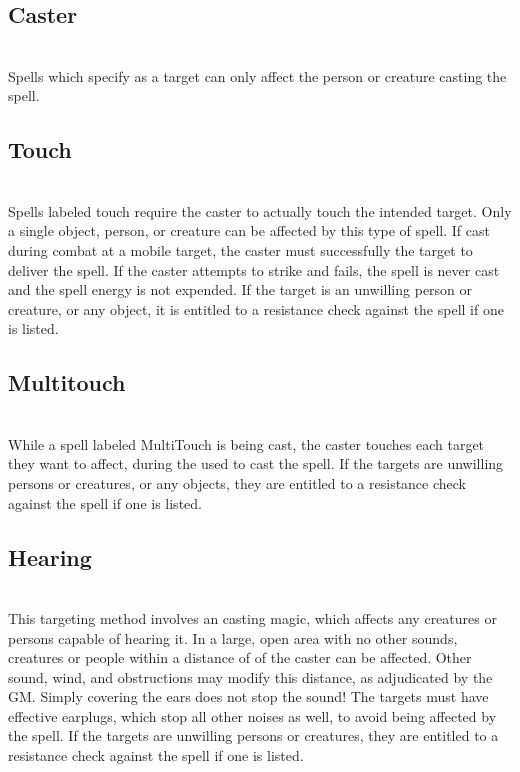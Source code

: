 \begin{multicols*}{2}
\subsection{Caster}
\\
Spells which specify  as a target can only
affect the person or creature casting the spell.
\subsection{Touch}
\\
Spells labeled touch require the caster to actually touch the intended target. Only a single object, person, or creature can be affected by this type of spell. If cast during combat at a mobile target, the caster must successfully  the target to deliver the spell. If the caster attempts to strike and fails, the spell is never cast and the spell energy is not expended. If the target is an unwilling person or creature,
or any object, it is entitled to a resistance check against the spell if one is listed.
\subsection{Multitouch}
\\
While a spell labeled MultiTouch is being cast, the caster touches each target they want to affect, during the  used to cast the spell.  If the targets are unwilling persons or creatures, or any objects, they are entitled to a resistance check against the spell if one is listed.
\subsection{Hearing}
\\
This targeting method involves an  casting magic, which affects any creatures or persons capable of hearing it. In a large, open area with no other sounds,  creatures or people within a distance of  of the caster can be affected. Other sound, wind, and obstructions may modify this distance, as adjudicated by the GM. Simply covering the ears does not stop the sound! The targets must have effective earplugs, which stop all other noises as well, to avoid being affected by the spell. If the targets are unwilling persons or creatures, they are entitled to a resistance check against the spell if one is listed.

\end{multicols*}

